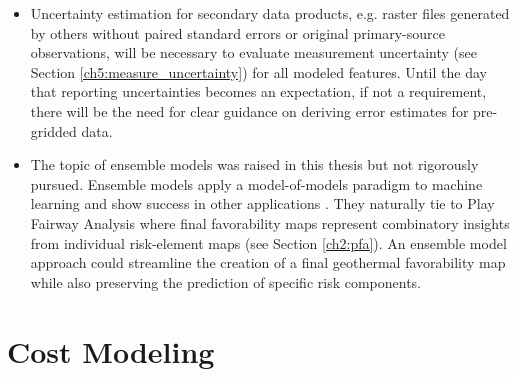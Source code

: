 \begin{itemize}
    \item Uncertainty estimation for secondary data products, e.g. raster files generated by others without paired standard errors or original primary-source observations, will be necessary to evaluate measurement uncertainty (see Section \ref{ch5:measure_uncertainty}) for all modeled features. Until the day that reporting uncertainties becomes an expectation, if not a requirement, there will be the need for clear guidance on deriving error estimates for pre-gridded data.
    
    \item The topic of ensemble models was raised in this thesis but not rigorously pursued. Ensemble models apply a model-of-models paradigm to machine learning and show success in other applications \citep[e.g.,][]{wilson_machine_2020}. They naturally tie to Play Fairway Analysis where final favorability maps represent combinatory insights from individual risk-element maps (see Section \ref{ch2:pfa}). An ensemble model approach could streamline the creation of a final geothermal favorability map while also preserving the prediction of specific risk components.
\end{itemize}

\section{Cost Modeling}\label{ch9:future_work_cm}

